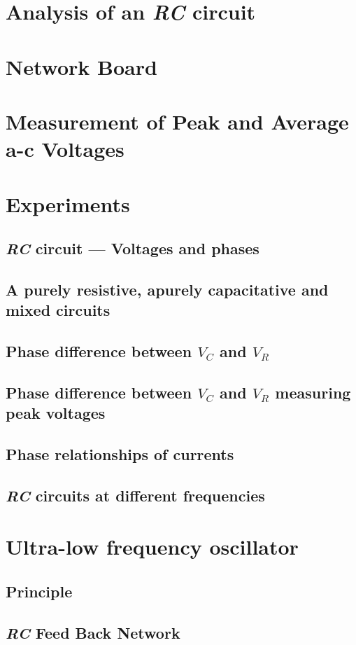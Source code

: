 \documentclass[12pt]{book}
\begin{document}
\section{Analysis of an \textit{RC} circuit}
\section{Network Board}
\section{Measurement of Peak and Average a-c Voltages}
\section{Experiments}
\subsection{\textit{RC} circuit --- Voltages and phases}
\subsection{A purely resistive, apurely capacitative and mixed circuits}
\subsection{Phase difference between $V_C$ and $V_R$}
\subsection{Phase difference between $V_C$ and $V_R$ measuring peak voltages}
\subsection{Phase relationships of currents}
\subsection{\textit{RC} circuits at different frequencies}
\section{Ultra-low frequency oscillator}
\subsection{Principle}
\subsection{\textit{RC} Feed Back Network}
\end{document}
